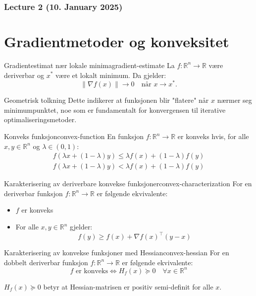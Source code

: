 \subsubsection{Lecture 2 (10. January 2025)}

\section*{Gradientmetoder og konveksitet}

\begin{theorem}{Gradientestimat nær lokale minima}{gradient-estimate}
    La $f: \mathbb{R}^n \to \mathbb{R}$ være deriverbar og $x^*$ være et lokalt minimum. Da gjelder:
    \[
        \|\nabla f(x)\| \to 0 \quad \text{når } x \to x^*.
    \]
\end{theorem}

\begin{remark}{Geometrisk tolkning}
    Dette indikerer at funksjonen blir "flatere" når $x$ nærmer seg minimumpunktet, noe som er fundamentalt for konvergensen til iterative optimaliseringsmetoder.
\end{remark}

\begin{definition}{Konveks funksjon}{convex-function}
    En funksjon $f: \mathbb{R}^n \to \mathbb{R}$ er konveks hvis, for alle $x, y \in \mathbb{R}^n$ og $\lambda \in (0,1)$:
    \begin{align*}
        f(\lambda x + (1 - \lambda)y) \leq \lambda f(x) + (1 - \lambda)f(y) \tag{Konveks} \\
        f(\lambda x + (1 - \lambda)y) < \lambda f(x) + (1 - \lambda)f(y) \tag{Strengt konveks}
    \end{align*}

\end{definition}

\begin{theorem}{Karakterisering av deriverbare konvekse funksjoner}{convex-characterization}
    For en deriverbar funksjon $f: \mathbb{R}^n \to \mathbb{R}$ er følgende ekvivalente:
    \begin{itemize}
        \item $f$ er konveks
        \item For alle $x, y \in \mathbb{R}^n$ gjelder:
              \[
                  f(y) \geq f(x) + \nabla f(x)^\top (y - x)
              \]
    \end{itemize}
\end{theorem}

\begin{theorem}{Karakterisering av konvekse funksjoner med Hessian}{convex-hessian}
    For en dobbelt deriverbar funksjon $f: \mathbb{R}^n \to \mathbb{R}$ er følgende ekvivalente:
    \[
        f \text{ er konveks} \iff H_f(x) \succeq 0 \quad \forall x \in \mathbb{R}^n
    \]

    $H_f(x) \succeq 0$ betyr at Hessian-matrisen er positiv semi-definit for alle $x$.

\end{theorem}

